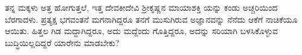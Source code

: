 ತನ್ನ ಮಕ್ಕಳು ಅತ್ತ ಹೋಗುತ್ತಲೆ, ಇತ್ತ ದೇವಕೀದೇವಿ ಶ್ರೀಕೃಷ್ಣನ ಮಾಯಾಶಕ್ತಿ ಯನ್ನು ಕಂಡು ಅಚ್ಚರಿಯಿಂದ ಬೆರಗಾದಳು. ಪ್ರತ್ಯಕ್ಷ ಭಗವಂತನೆ ಮಗನಾಗಿದ್ದರೂ ತನಗೆ ಮುಸುಗಿರುವ ಅಜ್ಞಾನವನ್ನು ನೆನೆದು ಆಕೆಗೆ ನಾಚಿಕೆಯೂ ಆಯಿತು. ಹಿತ್ತಲ ಗಿಡ ಮದ್ದಾಗಿದ್ದರೂ, ಅದು ಮದ್ದೆಂದು ಗೊತ್ತಿದ್ದರೂ, ಅದನ್ನು ಸರಿಯಾಗಿ ಬಳಸಿಕೊಳ್ಳುವ ಬುದ್ಧಿಯಿಲ್ಲದಿದ್ದರೆ ಯಾರೇನು ಮಾಡಬೇಕು?

